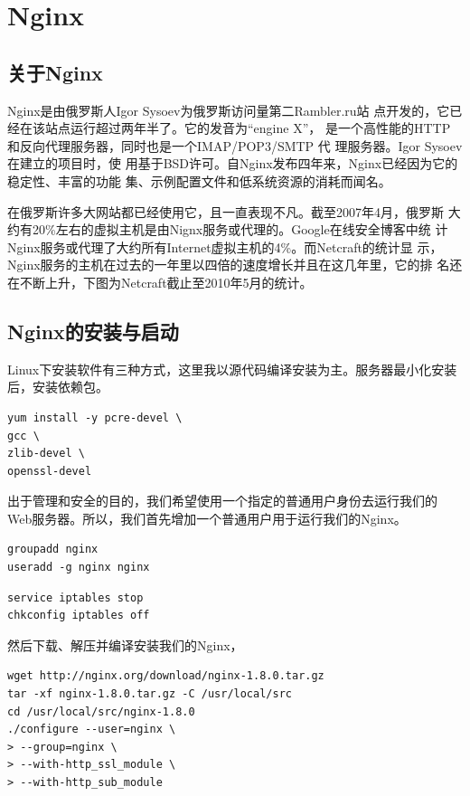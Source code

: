 \section{Nginx}
\label{sec:nginx}

\subsection{关于Nginx}
\label{subsec:AboutNginx}

Nginx是由俄罗斯人Igor Sysoev为俄罗斯访问量第二Rambler.ru站
点开发的，它已经在该站点运行超过两年半了。它的发音为“engine
X”， 是一个高性能的HTTP和反向代理服务器，同时也是一个IMAP/POP3/SMTP 代
理服务器。Igor Sysoev在建立的项目时，使
用基于BSD许可。自Nginx发布四年来，Nginx已经因为它的稳定性、丰富的功能
集、示例配置文件和低系统资源的消耗而闻名。

在俄罗斯许多大网站都已经使用它，且一直表现不凡。截至2007年4月，俄罗斯
大约有20\%左右的虚拟主机是由Nignx服务或代理的。Google在线安全博客中统
计Nginx服务或代理了大约所有Internet虚拟主机的4\%。而Netcraft的统计显
示，Nginx服务的主机在过去的一年里以四倍的速度增长并且在这几年里，它的排
名还在不断上升，下图为Netcraft截止至2010年5月的统计。

\subsection{Nginx的安装与启动}
\label{subsec:InstallAndStartNginx}

Linux下安装软件有三种方式，这里我以源代码编译安装为主。服务器最小化安装
后，安装依赖包。

\begin{verbatim}
yum install -y pcre-devel \
gcc \
zlib-devel \
openssl-devel
\end{verbatim}

出于管理和安全的目的，我们希望使用一个指定的普通用户身份去运行我们的
Web服务器。所以，我们首先增加一个普通用户用于运行我们的Nginx。

\begin{verbatim}
groupadd nginx
useradd -g nginx nginx
\end{verbatim}

\begin{verbatim}
service iptables stop
chkconfig iptables off
\end{verbatim}

然后下载、解压并编译安装我们的Nginx，

\begin{verbatim}
wget http://nginx.org/download/nginx-1.8.0.tar.gz
tar -xf nginx-1.8.0.tar.gz -C /usr/local/src
cd /usr/local/src/nginx-1.8.0
./configure --user=nginx \
> --group=nginx \
> --with-http_ssl_module \
> --with-http_sub_module
\end{verbatim}

